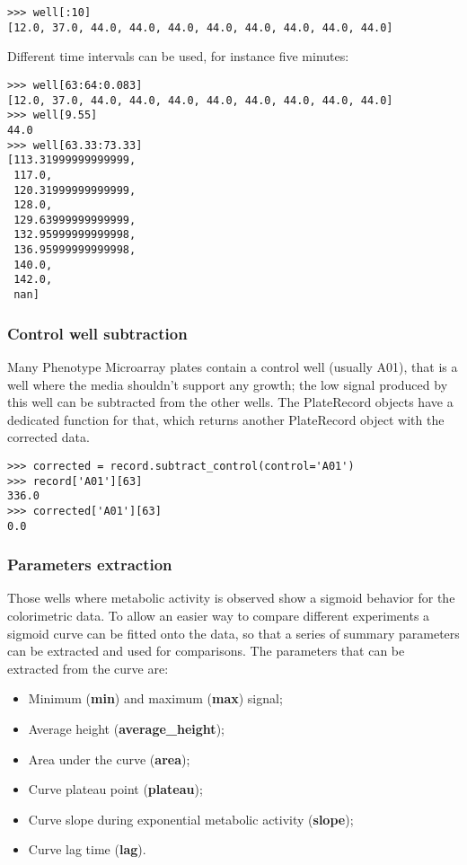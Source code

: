 \begin{verbatim}
>>> well[:10]  
[12.0, 37.0, 44.0, 44.0, 44.0, 44.0, 44.0, 44.0, 44.0, 44.0]
\end{verbatim}

Different time intervals can be used, for instance five minutes:
\begin{verbatim}
>>> well[63:64:0.083]
[12.0, 37.0, 44.0, 44.0, 44.0, 44.0, 44.0, 44.0, 44.0, 44.0]
>>> well[9.55]
44.0
>>> well[63.33:73.33]
[113.31999999999999,
 117.0,
 120.31999999999999,
 128.0,
 129.63999999999999,
 132.95999999999998,
 136.95999999999998,
 140.0,
 142.0,
 nan]
\end{verbatim}

\subsubsection{Control well subtraction}
Many Phenotype Microarray plates contain a control well (usually A01), that is a well where the media shouldn't support
any growth; the low signal produced by this well can be subtracted from the other wells.
The PlateRecord objects have a dedicated function for that, which returns another PlateRecord object
with the corrected data.

\begin{verbatim}
>>> corrected = record.subtract_control(control='A01')
>>> record['A01'][63]
336.0
>>> corrected['A01'][63]
0.0
\end{verbatim}

\subsubsection{Parameters extraction}
Those wells where metabolic activity is observed show a sigmoid behavior for the colorimetric data.
To allow an easier way to compare different experiments a sigmoid curve can be fitted onto the data,
so that a series of summary parameters can be extracted and used for comparisons.
The parameters that can be extracted from the curve are:

\begin{itemize}
  \item Minimum (\textbf{min}) and maximum (\textbf{max}) signal;

  \item Average height (\textbf{average\_height});

  \item Area under the curve (\textbf{area});

  \item Curve plateau point (\textbf{plateau});

  \item Curve slope during exponential metabolic activity (\textbf{slope});

  \item Curve lag time (\textbf{lag}).
\end{itemize}

